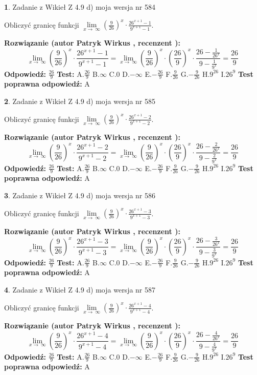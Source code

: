 \documentclass[12pt, a4paper]{article}
\theoremstyle{definition} %
\newtheorem{zad}{}
\newcommand{\zadStart}[1]{\begin{zad}#1\newline}
\newcommand{\zadStop}{\end{zad}}
\newcommand{\rozwStart}[2]{\noindent \textbf{Rozwiązanie (autor #1 , recenzent #2): }\newline}
\newcommand{\rozwStop}{\newline}
\newcommand{\odpStart}{\noindent \textbf{Odpowiedź:}\newline}
\newcommand{\odpStop}{\newline}
\newcommand{\testStart}{\noindent \textbf{Test:}\newline}
\newcommand{\testStop}{\newline}
\newcommand{\kluczStart}{\noindent \textbf{Test poprawna odpowiedź:}\newline}
\newcommand{\kluczStop}{\newline}
\begin{document}
\zadStart{Zadanie z Wikieł Z 4.9 d) moja wersja nr 584}


Obliczyć granicę funkcji  $\lim\limits_{x\to\ \infty}(\frac{9}{26})^{x}\cdot\frac{26^{x+1}-1}{9^{x+1}-1}$.
\zadStop
\rozwStart{Patryk Wirkus}{}
$$\lim\limits_{x\to\ \infty}(\frac{9}{26})^{x}\cdot\frac{26^{x+1}-1}{9^{x+1}-1}=\lim\limits_{x\to\ \infty}(\frac{9}{26})^{x}\cdot(\frac{26}{9})^{x} \cdot \frac{26-\frac{1}{26^{x}}}{9-\frac{1}{9^{x}}} = \frac{26}{9}$$
\rozwStop
\odpStart
$\frac{26}{9}$
\odpStop
\testStart
A.$\frac{26}{9}$ B.$\infty$ C.$0$ D.$-\infty$ E.$-\frac{26}{9}$
F.$\frac{9}{26}$ G.$-\frac{9}{26}$
H.$9^{26}$
I.$26^{9}$
\testStop
\kluczStart
A
\kluczStop



\zadStart{Zadanie z Wikieł Z 4.9 d) moja wersja nr 585}


Obliczyć granicę funkcji  $\lim\limits_{x\to\ \infty}(\frac{9}{26})^{x}\cdot\frac{26^{x+1}-2}{9^{x+1}-2}$.
\zadStop
\rozwStart{Patryk Wirkus}{}
$$\lim\limits_{x\to\ \infty}(\frac{9}{26})^{x}\cdot\frac{26^{x+1}-2}{9^{x+1}-2}=\lim\limits_{x\to\ \infty}(\frac{9}{26})^{x}\cdot(\frac{26}{9})^{x} \cdot \frac{26-\frac{2}{26^{x}}}{9-\frac{2}{9^{x}}} = \frac{26}{9}$$
\rozwStop
\odpStart
$\frac{26}{9}$
\odpStop
\testStart
A.$\frac{26}{9}$ B.$\infty$ C.$0$ D.$-\infty$ E.$-\frac{26}{9}$
F.$\frac{9}{26}$ G.$-\frac{9}{26}$
H.$9^{26}$
I.$26^{9}$
\testStop
\kluczStart
A
\kluczStop



\zadStart{Zadanie z Wikieł Z 4.9 d) moja wersja nr 586}


Obliczyć granicę funkcji  $\lim\limits_{x\to\ \infty}(\frac{9}{26})^{x}\cdot\frac{26^{x+1}-3}{9^{x+1}-3}$.
\zadStop
\rozwStart{Patryk Wirkus}{}
$$\lim\limits_{x\to\ \infty}(\frac{9}{26})^{x}\cdot\frac{26^{x+1}-3}{9^{x+1}-3}=\lim\limits_{x\to\ \infty}(\frac{9}{26})^{x}\cdot(\frac{26}{9})^{x} \cdot \frac{26-\frac{3}{26^{x}}}{9-\frac{3}{9^{x}}} = \frac{26}{9}$$
\rozwStop
\odpStart
$\frac{26}{9}$
\odpStop
\testStart
A.$\frac{26}{9}$ B.$\infty$ C.$0$ D.$-\infty$ E.$-\frac{26}{9}$
F.$\frac{9}{26}$ G.$-\frac{9}{26}$
H.$9^{26}$
I.$26^{9}$
\testStop
\kluczStart
A
\kluczStop



\zadStart{Zadanie z Wikieł Z 4.9 d) moja wersja nr 587}


Obliczyć granicę funkcji  $\lim\limits_{x\to\ \infty}(\frac{9}{26})^{x}\cdot\frac{26^{x+1}-4}{9^{x+1}-4}$.
\zadStop
\rozwStart{Patryk Wirkus}{}
$$\lim\limits_{x\to\ \infty}(\frac{9}{26})^{x}\cdot\frac{26^{x+1}-4}{9^{x+1}-4}=\lim\limits_{x\to\ \infty}(\frac{9}{26})^{x}\cdot(\frac{26}{9})^{x} \cdot \frac{26-\frac{4}{26^{x}}}{9-\frac{4}{9^{x}}} = \frac{26}{9}$$
\rozwStop
\odpStart
$\frac{26}{9}$
\odpStop
\testStart
A.$\frac{26}{9}$ B.$\infty$ C.$0$ D.$-\infty$ E.$-\frac{26}{9}$
F.$\frac{9}{26}$ G.$-\frac{9}{26}$
H.$9^{26}$
I.$26^{9}$
\testStop
\kluczStart
A
\kluczStop
\end{document}
